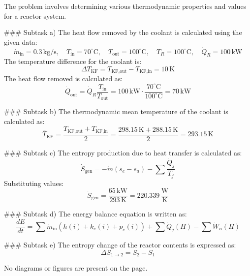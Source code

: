 The problem involves determining various thermodynamic properties and values for a reactor system.  

### Subtask a)  
The heat flow removed by the coolant is calculated using the given data:  
\[
\dot{m}_{\text{in}} = 0.3 \, \text{kg/s}, \quad T_{\text{in}} = 70^\circ\text{C}, \quad T_{\text{out}} = 100^\circ\text{C}, \quad T_R = 100^\circ\text{C}, \quad \dot{Q}_R = 100 \, \text{kW}
\]  
The temperature difference for the coolant is:  
\[
\Delta T_{\text{KF}} = T_{\text{KF,out}} - T_{\text{KF,in}} = 10 \, \text{K}
\]  
The heat flow removed is calculated as:  
\[
\dot{Q}_{\text{out}} = \dot{Q}_R \frac{T_{\text{in}}}{T_{\text{out}}} = 100 \, \text{kW} \cdot \frac{70^\circ\text{C}}{100^\circ\text{C}} = 70 \, \text{kW}
\]  

### Subtask b)  
The thermodynamic mean temperature of the coolant is calculated as:  
\[
\bar{T}_{\text{KF}} = \frac{T_{\text{KF,out}} + T_{\text{KF,in}}}{2} = \frac{298.15 \, \text{K} + 288.15 \, \text{K}}{2} = 293.15 \, \text{K}
\]  

### Subtask c)  
The entropy production due to heat transfer is calculated as:  
\[
\dot{S}_{\text{gen}} = -\dot{m} (s_e - s_a) - \sum \frac{\dot{Q}_j}{T_j}
\]  
Substituting values:  
\[
\dot{S}_{\text{gen}} = \frac{65 \, \text{kW}}{293 \, \text{K}} = 220.339 \, \frac{\text{W}}{\text{K}}
\]  

### Subtask d)  
The energy balance equation is written as:  
\[
\frac{dE}{dt} = \sum \dot{m}_{\text{in}}(h(i) + k_e(i) + p_e(i)) + \sum \dot{Q}_j(H) - \sum \dot{W}_n(H)
\]  

### Subtask e)  
The entropy change of the reactor contents is expressed as:  
\[
\Delta S_{1 \to 2} = S_2 - S_1
\]  

No diagrams or figures are present on the page.